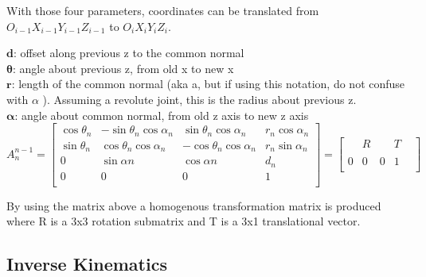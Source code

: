 \documentclass{UoNMCHA}
\numberwithin{equation}{section}
\begin{document}
	With those four parameters, coordinates can be translated from $O_{i-1}X_{i-1}Y_{i-1}Z_{i-1}$ to $O_iX_iY_iZ_i$.
	
	$\mathbf{d}$: offset along previous z to the common normal \\
	$\mathbf{\theta}$: angle about previous z, from old x to new x\\
	$\mathbf{r}$: length of the common normal (aka a, but if using this notation, do not confuse with $\alpha$ ). Assuming a revolute joint, this is the radius about previous z.\\
	$\mathbf{\alpha}$: angle about common normal, from old z axis to new z axis\\
	
	
	\begin{equation} \label{eq/denavit}
	A_{n}^{n-1} = 
	\begin{bmatrix}
	\cos{\theta_{n}} & -\sin{\theta_{n}} \cos{\alpha_{n}} & \sin{\theta_{n}} \cos{\alpha_{n}} & r_{n} \cos{\alpha_{n}} \\ 
	\sin{\theta_{n}} & \cos{\theta_{n}} \cos{\alpha_{n}} & -\cos{\theta_{n}} \cos{\alpha_{n}} & r_{n} \sin	{\alpha_{n}} \\
	0 & \sin{\alpha{n}} & \cos{\alpha{n}} & d_n \\
	0 & 0 & 0 & 1 \\ 
	\end{bmatrix} =
	\begin{bmatrix}
	& R &  & T \\
	& & & & \\	
	0 & 0 & 0 & 1 \\
	\end{bmatrix}
	\end{equation}
	
	
	By using the matrix above a homogenous transformation matrix is produced where R is a 3x3 rotation submatrix and T is a 3x1 translational vector. 
	
	\subsection{Inverse Kinematics}
	
\end{document}
